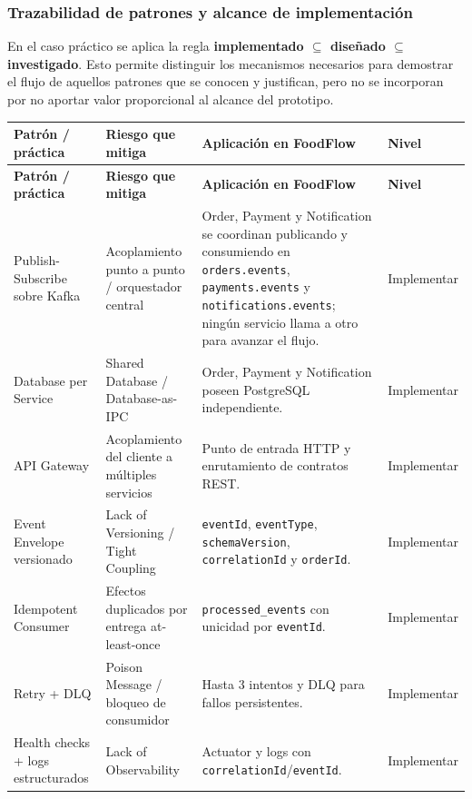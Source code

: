 \documentclass[12pt,a4paper]{article}
\begin{document}
\subsubsection{Trazabilidad de patrones y alcance de implementación}

En el caso práctico se aplica la regla \textbf{implementado $\subseteq$ diseñado $\subseteq$ investigado}. Esto permite distinguir los mecanismos necesarios para demostrar el flujo de aquellos patrones que se conocen y justifican, pero no se incorporan por no aportar valor proporcional al alcance del prototipo.

\scriptsize
\setlength{\tabcolsep}{3pt}
\begin{longtable}{P{0.19\textwidth} P{0.22\textwidth} P{0.36\textwidth} P{0.13\textwidth}}
\toprule
\textbf{Patrón / práctica} & \textbf{Riesgo que mitiga} & \textbf{Aplicación en FoodFlow} & \textbf{Nivel} \\
\midrule
\endfirsthead
\toprule
\textbf{Patrón / práctica} & \textbf{Riesgo que mitiga} & \textbf{Aplicación en FoodFlow} & \textbf{Nivel} \\
\midrule
\endhead
Publish-Subscribe sobre Kafka & Acoplamiento punto a punto / orquestador central & Order, Payment y Notification se coordinan publicando y consumiendo en \texttt{orders.events}, \texttt{payments.events} y \texttt{notifications.events}; ningún servicio llama a otro para avanzar el flujo. & Implementar \\
Database per Service & Shared Database / Database-as-IPC & Order, Payment y Notification poseen PostgreSQL independiente. & Implementar \\
API Gateway & Acoplamiento del cliente a múltiples servicios & Punto de entrada HTTP y enrutamiento de contratos REST. & Implementar \\
Event Envelope versionado & Lack of Versioning / Tight Coupling & \texttt{eventId}, \texttt{eventType}, \texttt{schemaVersion}, \texttt{correlationId} y \texttt{orderId}. & Implementar \\
Idempotent Consumer & Efectos duplicados por entrega at-least-once & \texttt{processed\_events} con unicidad por \texttt{eventId}. & Implementar \\
Retry + DLQ & Poison Message / bloqueo de consumidor & Hasta 3 intentos y DLQ para fallos persistentes. & Implementar \\
Health checks + logs estructurados & Lack of Observability & Actuator y logs con \texttt{correlationId}/\texttt{eventId}. & Implementar \\

\end{longtable}
\end{document}
